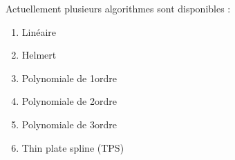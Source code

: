 
Actuellement plusieurs algorithmes sont disponibles :


\begin{enumerate}
\item Linéaire
\item Helmert
\item Polynomiale de 1\ier ordre
\item Polynomiale de 2\ieme ordre
\item Polynomiale de 3\ieme ordre
\item Thin plate spline (TPS)
\end{enumerate}


